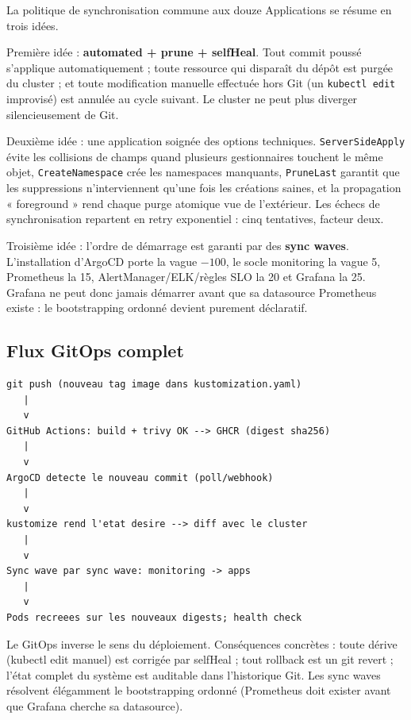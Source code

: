 \documentclass[12pt,a4paper,twoside,openright]{report}
\begin{document}
La politique de synchronisation commune aux douze Applications se résume en trois idées.

Première idée : \textbf{automated + prune + selfHeal}. Tout commit poussé s'applique automatiquement ; toute ressource qui disparaît du dépôt est purgée du cluster ; et toute modification manuelle effectuée hors Git (un \texttt{kubectl edit} improvisé) est annulée au cycle suivant. Le cluster ne peut plus diverger silencieusement de Git.

Deuxième idée : une application soignée des options techniques. \texttt{ServerSideApply} évite les collisions de champs quand plusieurs gestionnaires touchent le même objet, \texttt{CreateNamespace} crée les namespaces manquants, \texttt{PruneLast} garantit que les suppressions n'interviennent qu'une fois les créations saines, et la propagation « foreground » rend chaque purge atomique vue de l'extérieur. Les échecs de synchronisation repartent en retry exponentiel : cinq tentatives, facteur deux.

Troisième idée : l'ordre de démarrage est garanti par des \textbf{sync waves}. L'installation d'ArgoCD porte la vague $-100$, le socle monitoring la vague 5, Prometheus la 15, AlertManager/ELK/règles SLO la 20 et Grafana la 25. Grafana ne peut donc jamais démarrer avant que sa datasource Prometheus existe : le bootstrapping ordonné devient purement déclaratif.

\subsection{Flux GitOps complet}
\begin{lstlisting}[caption={Du commit au cluster : zéro kubectl humain}]
git push (nouveau tag image dans kustomization.yaml)
   |
   v
GitHub Actions: build + trivy OK --> GHCR (digest sha256)
   |
   v
ArgoCD detecte le nouveau commit (poll/webhook)
   |
   v
kustomize rend l'etat desire --> diff avec le cluster
   |
   v
Sync wave par sync wave: monitoring -> apps
   |
   v
Pods recreees sur les nouveaux digests; health check
\end{lstlisting}

\begin{whybox}
Le GitOps inverse le sens du déploiement. Conséquences concrètes : toute dérive (kubectl edit manuel) est corrigée par selfHeal ; tout rollback est un git revert ; l'état complet du système est auditable dans l'historique Git. Les sync waves résolvent élégamment le bootstrapping ordonné (Prometheus doit exister avant que Grafana cherche sa datasource).
\end{whybox}
\end{document}
